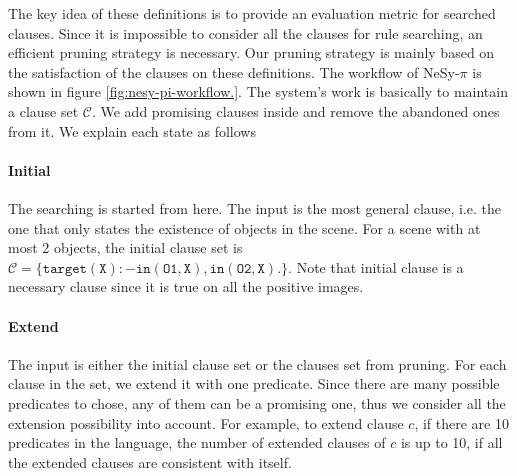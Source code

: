 \documentclass[
]{ceurart}
\newtheorem{definition}{Definition}[section]
\newcommand{\hk}[1]{\textcolor{Apricot}{[#1 \textsc{--HK}]}}
\begin{document}
	
	
	
	
	
	
	The key idea of these definitions is to provide an evaluation metric for searched clauses. Since it is impossible to consider all the clauses for rule searching, an efficient pruning strategy is necessary. Our pruning strategy is mainly based on the satisfaction of the clauses on these definitions. 
	The workflow of NeSy-$ \pi $ is shown in figure \ref{fig:nesy-pi-workflow.}. The system's work is basically to maintain a clause set $ \mathcal{C} $. We add promising clauses inside and remove the abandoned ones from it. We explain each state as follows
	\paragraph{Initial}
	The searching is started from here. The input is the most general clause, i.e. the one that only states the existence of objects in the scene. For a scene with at most 2 objects, the initial clause set is $ \mathcal{C} = \{\mathtt{target(X):-in(O1,X),in(O2,X).} \} $. Note that initial clause is a necessary clause since it is true on all the positive images.
	
	\paragraph{Extend}
	The input is either the initial clause set or the clauses set from pruning. For each clause in the set, we extend it with one predicate. Since there are many possible predicates to chose, any of them can be a promising one, thus we consider all the extension possibility into account. For example, to extend clause $ c $, if there are 10 predicates in the language, the number of extended clauses of $ c $ is up to 10, if all the extended clauses are consistent with itself.
	
\end{document}
